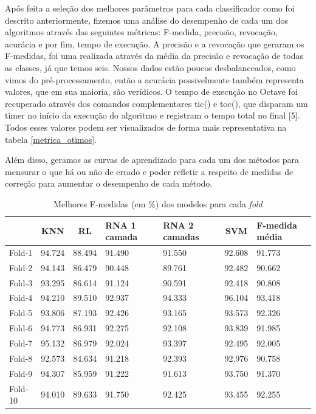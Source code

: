 \documentclass[10pt, conference, compsocconf]{IEEEtran}
\begin{document}
Após feita a seleção dos melhores parâmetros para cada classificador como foi 
descrito anteriormente, fizemos uma análise do desempenho de cada um dos 
algoritmos através das seguintes métricas: F-medida, precisão, revocação, 
acurácia e por fim, tempo de execução. A precisão e a revocação que geraram 
os F-medidas, foi uma realizada através da média da precisão e revocação de 
todas as classes, já que temos seis. Nossos dados estão poucos desbalanceados, 
como vimos do pré-processamento, então a acurácia possivelmente também 
representa valores, que em sua maioria, são verídicos. O tempo de execução 
no Octave foi recuperado através dos comandos complementares tic() e toc(), 
que disparam um timer no início da execução do algoritmo e registram o tempo 
total no final [5]. Todos esses valores podem ser visualizados de forma mais 
representativa na tabela \ref{metrica_otimos}.

Além disso, geramos as curvas de aprendizado para cada um dos métodos para
mensurar o que há ou não de errado e poder refletir a respeito de medidas de
correção para aumentar o desempenho de cada método. 

\begin{table}[!t]
\renewcommand{\arraystretch}{1.3}
\caption{Melhores F-medidas (em \%) dos modelos para cada \textsl{fold}}
\label{fmedidas}
\centering
    \begin{tabular}{|l|c|c|p{0.9cm}|p{0.9cm}|c|p{0.8cm}|}
    \hline
    & KNN & RL & RNA 1 camada & RNA 2
    camadas & SVM & F-medida média\\
    \hline
    Fold-1 & 94.724 & 88.494 & 91.490 & 91.550 & 92.608 & 91.773 \\ 
    Fold-2 & 94.143 & 86.479 & 90.448 & 89.761 & 92.482 & 90.662 \\
    Fold-3 & 93.295 & 86.614 & 91.124 & 90.591 & 92.418 & 90.808 \\ 
    Fold-4 & 94.210 & 89.510 & 92.937 & 94.333 & 96.104 & 93.418 \\ 
    Fold-5 & 93.806 & 87.193 & 92.426 & 93.165 & 93.573 & 92.326 \\ 
    Fold-6 & 94.773 & 86.931 & 92.275 & 92.108 & 93.839 & 91.985 \\ 
    Fold-7 & 95.132 & 86.979 & 92.024 & 93.397 & 92.495 & 92.005 \\ 
    Fold-8 & 92.573 & 84.634 & 91.218 & 92.393 & 92.976 & 90.758 \\ 
    Fold-9 & 94.307 & 85.959 & 91.222 & 91.613 & 93.750 & 91.370 \\ 
    Fold-10 & 94.010 & 89.633 & 91.750 & 92.425 & 93.455 & 92.255 \\
    \hline
    \end{tabular}
\end{table}
\end{document}
